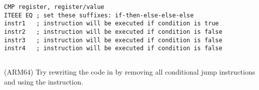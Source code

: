 \begin{lstlisting}[caption=ARM (\ThumbMode),style=customasmARM]
CMP register, register/value
ITEEE EQ ; set these suffixes: if-then-else-else-else
instr1   ; instruction will be executed if condition is true
instr2   ; instruction will be executed if condition is false
instr3   ; instruction will be executed if condition is false
instr4   ; instruction will be executed if condition is false
\end{lstlisting}

\subsection{\Exercise}

(ARM64) Try rewriting the code in  by removing all 
conditional jump instructions and using the  instruction.

